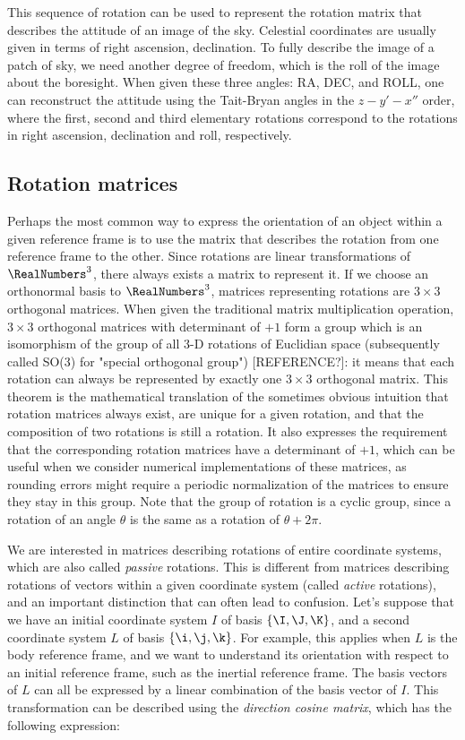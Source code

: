 This sequence of rotation can be used to represent the rotation matrix that describes the attitude of an image of the sky. Celestial coordinates are usually given in terms of right ascension, declination. To fully describe the image of a patch of sky, we need another degree of freedom, which is the roll of the image about the boresight. When given these three angles: RA, DEC, and ROLL, one can reconstruct the attitude using the Tait-Bryan angles in the $z-y'-x''$ order, where the first, second and third elementary rotations correspond to the rotations in right ascension, declination and roll, respectively.



\subsection{Rotation matrices}
\label{subsec:rotationMatrices}
Perhaps the most common way to express the orientation of an object within a given reference frame is to use the matrix that describes the rotation from one reference frame to the other. Since rotations are linear transformations of $\RealNumbers^3$, there always exists a matrix to represent it. If we choose an orthonormal basis to $\RealNumbers^3$, matrices representing rotations are $3\times 3$ orthogonal matrices. When given the traditional matrix multiplication operation, $3\times 3$ orthogonal matrices with determinant of $+1$ form a group which is an isomorphism of the group of all 3-D rotations of Euclidian space (subsequently called SO(3) for "special orthogonal group") [REFERENCE?]: it means that each rotation can always be represented by exactly one $3\times 3$ orthogonal matrix. This theorem is the mathematical translation of the sometimes obvious intuition that rotation matrices always exist, are unique for a given rotation, and that the composition of two rotations is still a rotation. It also expresses the requirement that the corresponding rotation matrices have a determinant of $+1$, which can be useful when we consider numerical implementations of these matrices, as rounding errors might require a periodic normalization of the matrices to ensure they stay in this group. Note that the group of rotation is a cyclic group, since a rotation of an angle $\theta$ is the same as a rotation of $\theta+2\pi$.

We are interested in matrices describing rotations of entire coordinate systems, which are also called \textit{passive} rotations. This is different from matrices describing rotations of vectors within a given coordinate system (called \textit{active} rotations), and an important distinction that can often lead to confusion. Let's suppose that we have an initial coordinate system $I$ of basis $\{\I,\J,\K\}$, and a second coordinate system $L$ of basis $\{\i,\j,\k\}$. For example, this applies when $L$ is the body reference frame, and we want to understand its orientation with respect to an initial reference frame, such as the inertial reference frame. The basis vectors of $L$ can all be expressed by a linear combination of the basis vector of $I$. This transformation can be described using the \textit{direction cosine matrix}, which has the following expression:

